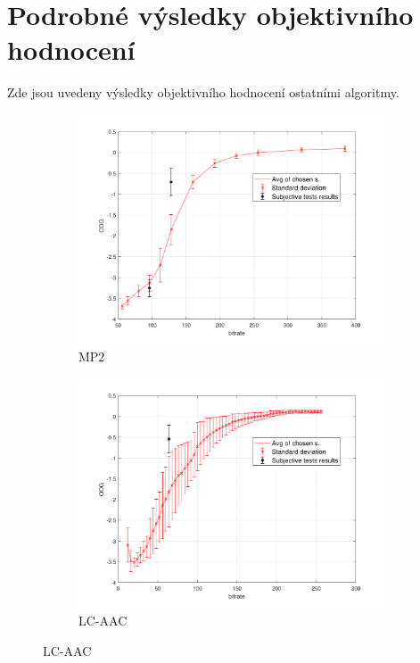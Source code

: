 \chapter{Podrobné výsledky objektivního hodnocení}
\label{app:3}

Zde jsou uvedeny výsledky objektivního hodnocení ostatními algoritmy.

\begin{figure}[h]
    \centering
    \begin{subfigure}{.5\textwidth}
        \centering
        \includegraphics[width=1\linewidth]{pic/objective/mp2Basic.pdf}
        \caption{MP2}
        \label{app:bas:sub1}
    \end{subfigure}%
    \begin{subfigure}{.5\textwidth}
        \centering
        \includegraphics[width=1\linewidth]{pic/objective/lcBasic.pdf}
        \caption{LC-AAC}
        \label{app:bas:sub2}
    \end{subfigure}
\end{figure}
